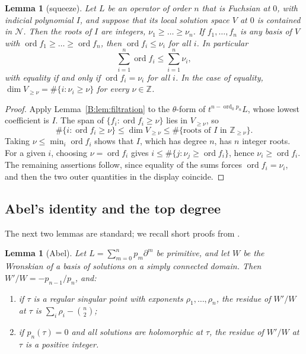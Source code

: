 \documentclass[11pt,a4paper]{article}
\newtheorem{lemma}[theorem]{Lemma}
\theoremstyle{definition}
\theoremstyle{remark}
\newcommand{\Z}{\mathbb Z}
\DeclareMathOperator{\ord}{ord}
\numberwithin{equation}{section}
\begin{document}
\begin{lemma}[squeeze]\label{B:lem:squeeze}
Let $L$ be an operator of order $n$ that is Fuchsian at $0$, with indicial polynomial $I$, and suppose that its local solution space $V$ at $0$ is contained in $\mathcal N$. Then the roots of $I$ are integers, $\nu_1\ge\dots\ge\nu_n$. If $f_1,\dots,f_n$ is any basis of $V$ with $\ord f_1\ge\dots\ge\ord f_n$, then $\ord f_i\le\nu_i$ for all $i$. In particular
\[
\sum_{i=1}^n\ord f_i\le\sum_{i=1}^n\nu_i,
\]
with equality if and only if $\ord f_i=\nu_i$ for all $i$. In the case of equality, $\dim V_{\ge\nu}=\#\{i:\nu_i\ge\nu\}$ for every $\nu\in\Z$.
\end{lemma}

\begin{proof}
Apply Lemma~\ref{B:lem:filtration} to the $\theta$-form of $t^{n-\ord_0p_n}L$, whose lowest coefficient is $I$. The span of $\{f_i:\ord f_i\ge\nu\}$ lies in $V_{\ge\nu}$, so
\[
\#\{i:\ord f_i\ge\nu\}\le\dim V_{\ge\nu}\le\#\{\text{roots of $I$ in $\Z_{\ge\nu}$}\}.
\]
Taking $\nu\le\min_i\ord f_i$ shows that $I$, which has degree $n$, has $n$ integer roots. For a given $i$, choosing $\nu=\ord f_i$ gives $i\le\#\{j:\nu_j\ge\ord f_i\}$, hence $\nu_i\ge\ord f_i$. The remaining assertions follow, since equality of the sums forces $\ord f_i=\nu_i$, and then the two outer quantities in the display coincide.
\end{proof}

\subsection{Abel's identity and the top degree}
The next two lemmas are standard; we recall short proofs from \cite{Kei26}.

\begin{lemma}[Abel]\label{B:lem:abel}
Let $L=\sum_{m=0}^np_m\partial^m$ be primitive, and let $W$ be the Wronskian of a basis of solutions on a simply connected domain. Then $W'/W=-p_{n-1}/p_n$, and:
\begin{enumerate}
\item[(a)] if $\tau$ is a regular singular point with exponents $\rho_1,\dots,\rho_n$, the residue of $W'/W$ at $\tau$ is $\sum_i\rho_i-\binom n2$;
\item[(b)] if $p_n(\tau)=0$ and all solutions are holomorphic at $\tau$, the residue of $W'/W$ at $\tau$ is a positive integer.
\end{enumerate}
\end{lemma}
\end{document}
